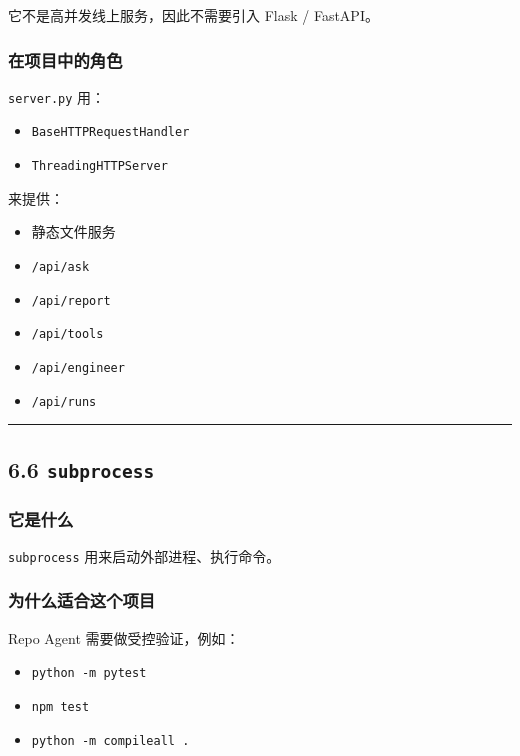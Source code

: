 \documentclass[UTF8,12pt,openany]{ctexbook}
\begin{document}
它不是高并发线上服务，因此不需要引入 Flask / FastAPI。\par

\subsubsection{在项目中的角色}

\texttt{server.py} 用：\par

\begin{itemize}
\item \texttt{BaseHTTPRequestHandler}
\item \texttt{ThreadingHTTPServer}
\end{itemize}

来提供：\par

\begin{itemize}
\item 静态文件服务
\item \texttt{/api/ask}
\item \texttt{/api/report}
\item \texttt{/api/tools}
\item \texttt{/api/engineer}
\item \texttt{/api/runs}
\end{itemize}

\hrule

\subsection{6.6 \texttt{subprocess}}

\subsubsection{它是什么}

\texttt{subprocess} 用来启动外部进程、执行命令。\par

\subsubsection{为什么适合这个项目}

Repo Agent 需要做受控验证，例如：\par

\begin{itemize}
\item \texttt{python -m pytest}
\item \texttt{npm test}
\item \texttt{python -m compileall .}
\end{itemize}
\end{document}
